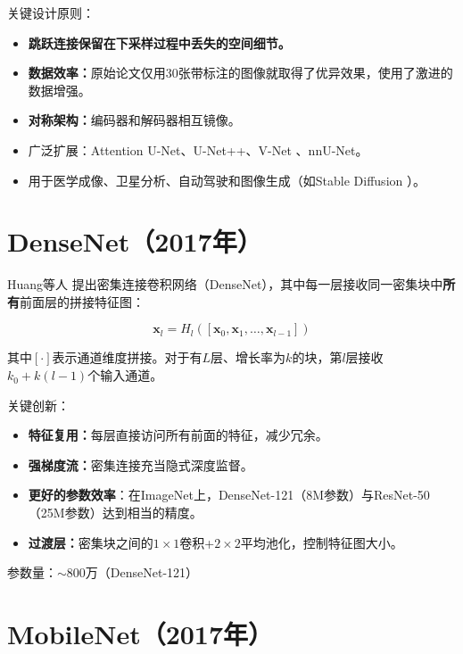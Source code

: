 关键设计原则：
\begin{itemize}
    \item \textbf{跳跃连接保留在下采样过程中丢失的空间细节。}
    \item \textbf{数据效率：}原始论文仅用30张带标注的图像就取得了优异效果，使用了激进的数据增强。
    \item \textbf{对称架构：}编码器和解码器相互镜像。
    \item 广泛扩展：Attention U-Net、U-Net++、V-Net \cite{milletari2016v}、nnU-Net。
    \item 用于医学成像、卫星分析、自动驾驶和图像生成（如Stable Diffusion \cite{rombach2022high}）。
\end{itemize}

\section{DenseNet（2017年）}

Huang等人 \cite{huang2017densely}提出密集连接卷积网络（DenseNet），其中每一层接收同一密集块中\textbf{所有}前面层的拼接特征图：

\begin{equation}
\mathbf{x}_l = H_l\left([\mathbf{x}_0, \mathbf{x}_1, \ldots, \mathbf{x}_{l-1}]\right)
\end{equation}

其中$[\cdot]$表示通道维度拼接。对于有$L$层、增长率为$k$的块，第$l$层接收$k_0 + k(l-1)$个输入通道。

关键创新：
\begin{itemize}
    \item \textbf{特征复用：}每层直接访问所有前面的特征，减少冗余。
    \item \textbf{强梯度流：}密集连接充当隐式深度监督。
    \item \textbf{更好的参数效率}：在ImageNet上，DenseNet-121（8M参数）与ResNet-50（25M参数）达到相当的精度。
    \item \textbf{过渡层：}密集块之间的$1\times1$卷积+$2\times2$平均池化，控制特征图大小。
\end{itemize}

参数量：$\sim$800万（DenseNet-121）

\section{MobileNet（2017年）}


